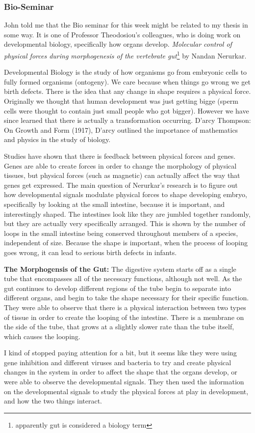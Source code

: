 \documentclass[letterpaper,oneside,titlepage]{article}
\begin{document}
\subsubsection*{Bio-Seminar}
John told me that the Bio seminar for this week might be related to my thesis in some way.  It is one of Professor Theodosiou's colleagues, who is doing work on developmental biology, specifically how organs develop.  \emph{Molecular control of physical forces during morphogenesis of the vertebrate gut}\footnote{apparently gut is considered a biology term} by Nandan Nerurkar.
\par
Developmental Biology is the study of how organisms go from embryonic cells to fully formed organisms (ontogeny).  We care because when things go wrong we get birth defects.  There is the idea that any change in shape requires a physical force.  Originally we thought that human development was just getting bigge (sperm cells were thought to contain just small people who got bigger).  However we have since learned that there is actually a transformation occurring.  D'arcy Thompson: On Growth and Form (1917), D'arcy outlined the importance of mathematics and physics in the study of biology.
\par
Studies have shown that there is feedback between physical forces and genes.  Genes are able to create forces in order to change the morphology of physical tissues, but physical forces (such as magnetic) can actually affect the way that genes get expressed.  The main question of Nerurkar's research is to figure out how developmental signals modulate physical forces to shape developing embryo, specifically by looking at the small intestine, because it is important, and interestingly shaped.  The intestines look like they are jumbled together randomly, but they are actually very specifically arranged.  This is shown by the number of loops in the small intestine being conserved throughout members of a species, independent of size.  Because the shape is important, when the process of looping goes wrong, it can lead to serious birth defects in infants.
\par
\textbf{The Morphogensis of the Gut:}  The digestive system starts off as a single tube that encompasses all of the necessary functions, although not well.  As the gut continues to develop different regions of the tube begin to separate into different organs, and begin to take the shape necessary for their specific function.  They were able to observe that there is a physical interaction between two types of tissue in order to create the looping of the intestine.  There is a membrane on the side of the tube, that grows at a slightly slower rate than the tube itself, which causes the looping.
\par
I kind of stopped paying attention for a bit, but it seems like they were using gene inhibition and different viruses and bacteria to try and create physical changes in the system in order to affect the shape that the organs develop, or were able to observe the developmental signals.  They then used the information on the developmental signals to study the physical forces at play in development, and how the two things interact.
\end{document}
